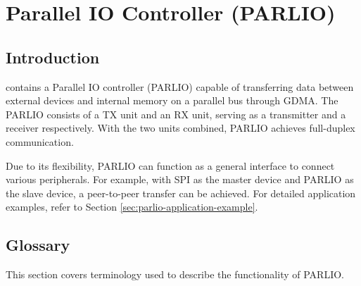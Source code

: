 \documentclass[main\_\_EN.tex]{subfiles}
\begin{document}

\ifglobal
\else
    {\let\clearpage\relax \listoftodos}
    {\let\clearpage\relax \listofdonetodos}
    \tableofcontents
\fi



\hypertarget{parlio}{}
\chapter{Parallel IO Controller (PARLIO)}
\label{mod:parlio}



\section{Introduction}
\chipname{} contains a Parallel IO controller (PARLIO) capable of transferring data between external devices and internal memory on a parallel bus through GDMA. The PARLIO consists of a TX unit and an RX unit, serving as a transmitter and a receiver respectively. With the two units combined, PARLIO achieves full-duplex communication.

Due to its flexibility, PARLIO can function as a general interface to connect various peripherals. For example, with SPI as the master device and PARLIO as the slave device, a peer-to-peer transfer can be achieved. For detailed application examples, refer to Section \ref{sec:parlio-application-example}.

\section{Glossary}
This section covers terminology used to describe the functionality of PARLIO.
\end{document}
